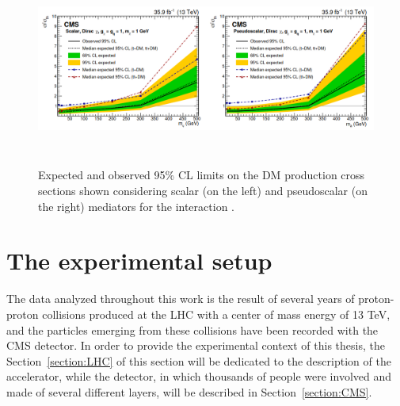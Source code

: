 \documentclass[a4paper, 10pt, openright]{report}
\begin{document}
\begin{figure}[htbp]
\begin{center}
\includegraphics[width=15.5cm, height=6.4cm]{figs/Combination2019.png}
\caption{Expected and observed 95\% \ac{CL} limits on the \ac{DM} production cross sections shown considering scalar (on the left) and pseudoscalar (on the right) mediators for the interaction \cite{PreviousSingleDoubleTopAllLep13CMS}.}
\label{figure:Combination2019}
\end{center}
\end{figure}



























\chapter{The experimental setup} \label{chapter:Device}

The data analyzed throughout this work is the result of several years of proton-proton collisions produced at the \ac{LHC} with a center of mass energy of 13 TeV, and the particles emerging from these collisions have been recorded with the \ac{CMS} detector. In order to provide the experimental context of this thesis, the Section~\ref{section:LHC} of this section will be dedicated to the description of the accelerator, while the detector, in which thousands of people were involved and made of several different layers, will be described in Section~\ref{section:CMS}.
\end{document}
